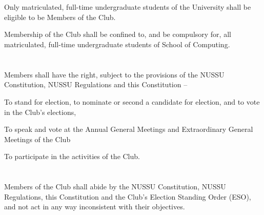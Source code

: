 
\section{}
Only matriculated, full-time undergraduate students of the University shall be eligible to be Members of the Club.
	\begin{legal}
		\item Membership of the Club shall be confined to, and be compulsory for, all matriculated, full-time undergraduate students of School of Computing.
	\end{legal}

\section{}
Members shall have the right, subject to the provisions of the NUSSU Constitution, NUSSU Regulations and this Constitution –
	\begin{legal}
		\item To stand for election, to nominate or second a candidate for election, and to vote in the Club's elections,
		\item To speak and vote at the Annual General Meetings and Extraordinary General Meetings of the Club
		\item To participate in the activities of the Club.
	\end{legal}

\section{}
Members of the Club shall abide by the NUSSU Constitution, NUSSU Regulations, this Constitution and the Club's Election Standing Order (ESO), and not act in any way inconsistent with their objectives.